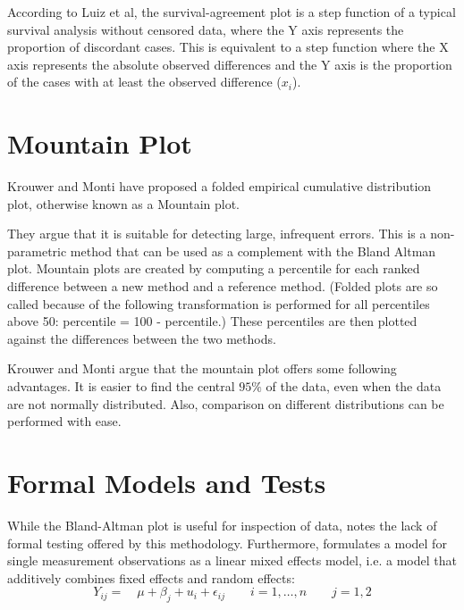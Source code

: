 \documentclass[12pt, a4paper]{report}
\theoremstyle{plain}
\theoremstyle{definition}
\theoremstyle{remark}
\begin{document}
	According to Luiz et al, the survival-agreement plot is a step function of a typical survival analysis without censored data, where the Y axis represents the proportion of discordant cases. This is equivalent to a step function where the X axis represents the absolute  observed differences and the Y axis is the proportion of the cases with at least the observed 
	difference ($x_i$). 
	
	
	
	
	
	
	
	
	\section{Mountain Plot} Krouwer and Monti have proposed a folded empirical cumulative distribution plot, otherwise known as a Mountain plot.
	
	They argue that it is suitable for detecting large, infrequent errors. This is a non-parametric method that can be used as a complement with the Bland Altman plot.  Mountain plots are created by computing a percentile
	for each ranked difference between a new method and a reference method. (Folded plots are so called because of the following transformation is performed for all percentiles above 50: percentile = 100 - percentile.) These percentiles are then plotted against the differences between the two methods.
	
	Krouwer and Monti argue that the mountain plot offers some following advantages. It is easier to find the central $95\%$ of the data, even when the data are not normally distributed. Also, comparison on different distributions can be performed with ease.
	
	
	

	\section{Formal Models and Tests}
	While the Bland-Altman plot is useful for inspection of data, \citet{Kinsella} notes the lack of formal testing offered by
	this methodology. Furthermore, \citet{Kinsella} formulates a model for
	single measurement observations as a
	linear mixed effects model, i.e. a model that additively combines
	fixed effects and random effects:
	\[
	Y_{ij} =\quad \mu + \beta_{j} + u_{i} + \epsilon_{ij} \qquad i = 1,\dots,n
	\qquad j=1,2\]
	
\end{document}
